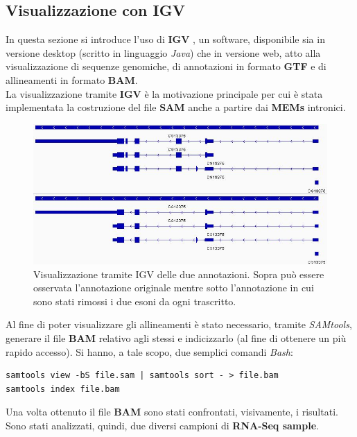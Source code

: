 \documentclass[a4paper,12pt, oneside]{book}
\begin{document}
\subsection{Visualizzazione con IGV}
In questa sezione si introduce l'uso di \textbf{IGV} \cite{igv}, un software,
disponibile sia in versione desktop (scritto in linguaggio \textit{Java}) che in
versione web, atto alla visualizzazione di sequenze genomiche, di annotazioni in
formato \textbf{GTF} e di allineamenti in formato \textbf{BAM}. \\
La visualizzazione tramite \textbf{IGV} è la motivazione principale per cui è
stata implementata la costruzione del file \textbf{SAM} anche a partire dai
\textbf{MEMs} intronici.\\
\begin{figure}
  \centering
  \includegraphics[scale = 0.5]{img/igv.jpg}
  \caption{Visualizzazione tramite IGV delle due annotazioni. Sopra può essere
    osservata l'annotazione originale mentre sotto l'annotazione in cui sono
    stati rimossi i due esoni da ogni trascritto.}
  \label{vis}
\end{figure}
Al fine di poter visualizzare gli allineamenti è stato necessario, tramite
\textit{SAMtools}, generare il file \textbf{BAM} relativo agli stessi e
indicizzarlo (al fine di ottenere un più rapido accesso). Si hanno, a tale
scopo, due semplici comandi \textit{Bash}: 
\begin{verbatim}
samtools view -bS file.sam | samtools sort - > file.bam
samtools index file.bam
\end{verbatim}
Una volta ottenuto il file \textbf{BAM} sono stati confrontati, visivamente,
i risultati. Sono stati analizzati, quindi, due diversi campioni
di \textbf{RNA-Seq sample}. 
\newpage
\end{document}
